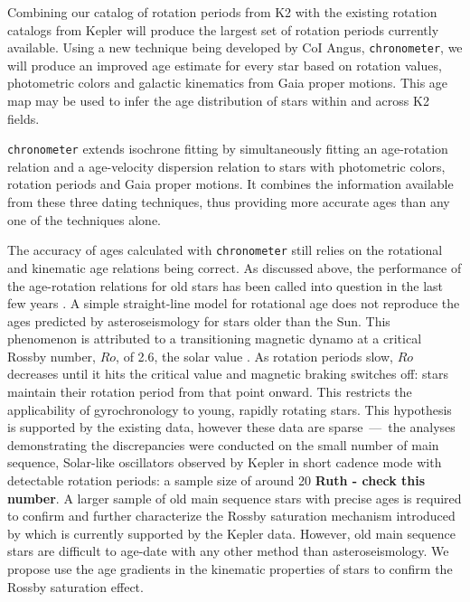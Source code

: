 \documentclass[12pt]{article}
\begin{document}
Combining our catalog of rotation periods from K2 with the existing rotation
catalogs from Kepler will produce the largest set of rotation periods
currently available.
Using a new technique being developed by CoI Angus, {\tt chronometer}, we
will produce an improved age estimate for every star based on rotation values,
photometric colors and galactic kinematics from Gaia proper motions.
This age map may be used to infer the age distribution of stars within and
across K2 fields.

{\tt chronometer} extends isochrone fitting by simultaneously fitting an
age-rotation relation and a age-velocity dispersion relation to stars with
photometric colors, rotation periods and Gaia proper motions.
It combines the information available from these three dating techniques, thus
providing more accurate ages than any one of the techniques alone.

The accuracy of ages calculated with {\tt chronometer} still relies on the
rotational and kinematic age relations being correct.
As discussed above, the performance of the age-rotation relations for old
stars has been called into question in the last few years \citep{angus2015,van-saders2016, Metcalfe2016}.
A simple straight-line model for rotational age does not reproduce the ages
predicted by asteroseismology for stars older than the Sun.
This phenomenon is attributed to a transitioning magnetic dynamo at a critical
Rossby number, $Ro$, of 2.6, the solar value \citep{van-saders2016}.
As rotation periods slow, $Ro$ decreases until it hits the critical value and
magnetic braking switches off: stars maintain their rotation period from that
point onward.
This restricts the applicability of gyrochronology to young, rapidly rotating
stars.
This hypothesis is supported by the existing data, however these data are
sparse~---~the analyses demonstrating the discrepancies were conducted on the
small number of main sequence, Solar-like oscillators observed by Kepler in
short cadence mode with detectable rotation periods: a sample size of around
20 {\bf Ruth - check this number}.
A larger sample of old main sequence stars with precise ages is required to
confirm and further characterize the Rossby saturation mechanism introduced by
\citep{van-saders2016} which is currently supported by the Kepler data.
However, old main sequence stars are difficult to age-date with any other
method than asteroseismology.
We propose use the age gradients in the kinematic properties of stars to
confirm the Rossby saturation effect.
\end{document}
